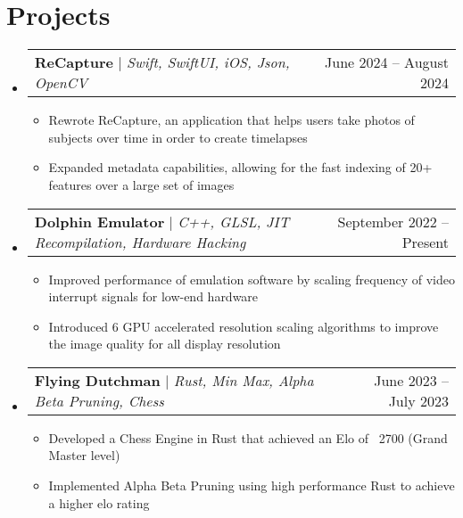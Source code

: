 \documentclass[letterpaper,11pt]{article}
\makeatletter
\newcommand{\resumeItem}[1]{
  \item\small{
    {#1 \vspace{-2pt}}
  }
}
\newcommand{\resumeProjectHeading}[2]{
    \item
    \begin{tabular*}{0.97\textwidth}{l@{\extracolsep{\fill}}r}
      \small#1 & #2 \\
    \end{tabular*}\vspace{-7pt}
}
\newcommand{\resumeSubHeadingListStart}{\begin{itemize}[leftmargin=0.15in, label={}]}
\newcommand{\resumeSubHeadingListEnd}{\end{itemize}}
\newcommand{\resumeItemListStart}{\begin{itemize}}
\newcommand{\resumeItemListEnd}{\end{itemize}\vspace{-5pt}}
\makeatother
\begin{document}
\section{Projects}
    \resumeSubHeadingListStart

    \resumeProjectHeading
        {\textbf{ReCapture} $|$ \emph{Swift, SwiftUI, iOS, Json, OpenCV}}{June 2024 -- August 2024}
        \resumeItemListStart
          \resumeItem{Rewrote ReCapture, an application that helps users take photos of subjects over time in order to create timelapses}
          \resumeItem{Expanded metadata capabilities, allowing for the fast indexing of 20+ features over a large set of images}
            \resumeItemListEnd

      \resumeProjectHeading
          {\textbf{Dolphin Emulator} $|$ \emph{C++, GLSL, JIT Recompilation, Hardware Hacking}}{September 2022 -- Present}
          \resumeItemListStart
            \resumeItem{Improved performance of emulation software by scaling frequency of video interrupt signals for low-end hardware}
            \resumeItem{Introduced 6 GPU accelerated resolution scaling algorithms to improve the image quality for all display resolution}
          \resumeItemListEnd

      \resumeProjectHeading
          {\textbf{Flying Dutchman} $|$ \emph{Rust, Min Max, Alpha Beta Pruning, Chess}}{June 2023 -- July 2023}
          \resumeItemListStart
            \resumeItem{Developed a Chess Engine in Rust that achieved an Elo of ~2700 (Grand Master level)}
            \resumeItem{Implemented Alpha Beta Pruning using high performance Rust to achieve a higher elo rating}
          \resumeItemListEnd
    \resumeSubHeadingListEnd

\end{document}

